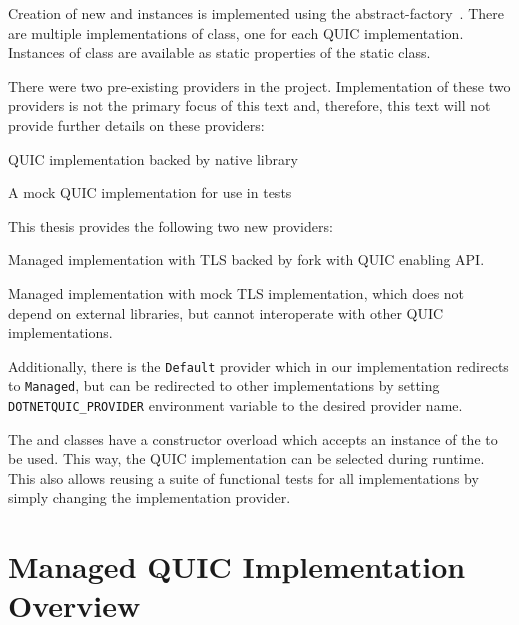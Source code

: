 Creation of new \QuicListener{} and \QuicConnection{} instances is implemented using the
\gls{abstract-factory}~\cite{wiki:abstract-factory-pattern}. There are multiple implementations of
\QuicImplementationProvider{} class, one for each QUIC implementation. Instances of
\QuicImplementationProvider{} class are available as static properties of the
 static class.

There were two pre-existing providers in the  project. Implementation of
these two providers is not the primary focus of this text and, therefore, this text will not provide
further details on these providers:

\begin{itemize}

   QUIC implementation backed by \libmsquic{} native library

   A mock QUIC implementation for use in tests

\end{itemize}

This thesis provides the following two new providers:

\begin{itemize}

   Managed implementation with TLS backed by \libopenssl{} fork with QUIC
enabling API\@.

   Managed implementation with mock TLS implementation, which does
not depend on external libraries, but cannot interoperate with other QUIC implementations.

\end{itemize}

Additionally, there is the \texttt{Default} provider which in our implementation redirects to
\texttt{Managed}, but can be redirected to other implementations by setting
\texttt{DOTNETQUIC_PROVIDER} environment variable to the desired provider name.

The \QuicListener{} and \QuicConnection{} classes have a constructor overload which accepts an
instance of the \QuicImplementationProvider{} to be used. This way, the QUIC implementation can be
selected during runtime. This also allows reusing a suite of functional tests for all
implementations by simply changing the implementation provider.

\section{Managed QUIC Implementation Overview}

